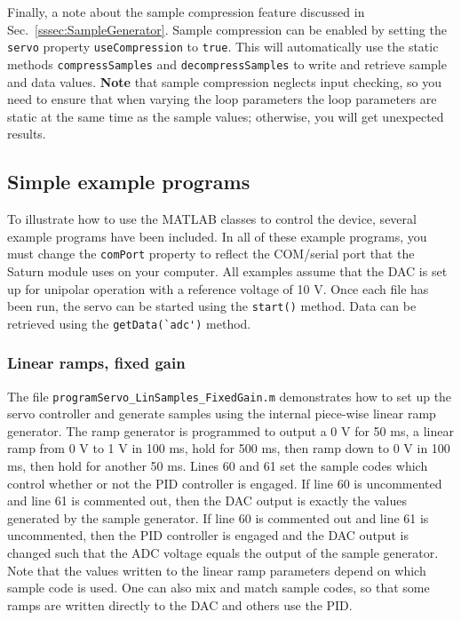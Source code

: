 \documentclass{article}
\begin{document}
Finally, a note about the sample compression feature discussed in Sec.~\ref{sssec:SampleGenerator}.  Sample compression can be enabled by setting the \verb|servo| property \verb|useCompression| to \verb|true|.  This will automatically use the static methods \verb|compressSamples| and \verb|decompressSamples| to write and retrieve sample and data values.  \textbf{Note} that sample compression neglects input checking, so you need to ensure that when varying the loop parameters the loop parameters are static at the same time as the sample values; otherwise, you will get unexpected results.

\subsection{Simple example programs}
\label{ssec:simpleExamplePrograms}

To illustrate how to use the MATLAB classes to control the device, several example programs have been included.  In all of these example programs, you must change the \verb|comPort| property to reflect the COM/serial port that the Saturn module uses on your computer.  All examples assume that the DAC is set up for unipolar operation with a reference voltage of 10 V.  Once each file has been run, the servo can be started using the \verb|start()| method.  Data can be retrieved using the \verb|getData(`adc')| method.

\subsubsection{Linear ramps, fixed gain}
\label{sssec:linearRamps}
The file \verb|programServo_LinSamples_FixedGain.m| demonstrates how to set up the servo controller and generate samples using the internal piece-wise linear ramp generator.  The ramp generator is programmed to output a 0 V for 50 ms, a linear ramp from 0 V to 1 V in 100 ms, hold for 500 ms, then ramp down to 0 V in 100 ms, then hold for another 50 ms.  Lines 60 and 61 set the sample codes which control whether or not the PID controller is engaged.  If line 60 is uncommented and line 61 is commented out, then the DAC output is exactly the values generated by the sample generator.  If line 60 is commented out and line 61 is uncommented, then the PID controller is engaged and the DAC output is changed such that the ADC voltage equals the output of the sample generator.  Note that the values written to the linear ramp parameters depend on which sample code is used.  One can also mix and match sample codes, so that some ramps are written directly to the DAC and others use the PID.
\end{document}
